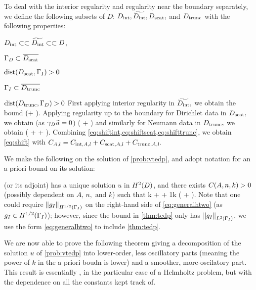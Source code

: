 To deal with the interior regularity and regularity near the boundary separately, we define the following subsets of $D$: $D_{\mathrm{int}},\widetilde{D_{\mathrm{int}}},D_{\mathrm{scat}},$ and $D_{\mathrm{trunc}}$ with the following properties:
\bit
\item $D_{\mathrm{int}} \subset\subset \widetilde{D_{\mathrm{int}}} \subset\subset D$,
\item $\Gamma_{D} \subset \overline{D_{\mathrm{scat}}}$
\item $\operatorname{dist}(D_{\mathrm{scat}},\Gamma_{I}) > 0 $
  \item $\Gamma_{I} \subset \overline{D_{\mathrm{trunc}}}$
\item $\operatorname{dist}(D_{\mathrm{trunc}},\Gamma_{D}) > 0 $
    \eit
    First applying interior regularity \cite[Theorem 4.16]{Mc:00} in $\widetilde{D_{\mathrm{int}}},$ we obtain the bound
    \beq\label{eq:shiftint}
\NHlptDint{\utilde} \leq \CintAl \mleft(\NHoDinttilde + \NHlDinttilde{\ftilde}\mright).
\eeq
Applying regularity up to the boundary for Dirichlet data \cite[Theorem 4.18 (i)]{Mc:00} in $D_{\mathrm{scat}},$ we obtain (as $\gamma_{D} \widetilde{u} = 0$)
\beq\label{eq:shiftscat}
\NHlptDscat{\utilde} \leq \CscatAl \mleft(\NHoD{\utilde} + \NHlD{\ftilde}\mright)
\eeq
and similarly for Neumann data \cite[Theorem 4.18 (ii)]{Mc:00} in $D_{\mathrm{trunc}},$ we obtain
\beq\label{eq:shifttrunc}
\NHlptDtrunc{\utilde} \leq \CtruncAl \mleft(\NHoD{\utilde} + \NHlphGI{\dn \utilde} + \NHlD{\ftilde}\mright).
\eeq
Combining \cref{eq:shiftint,eq:shiftscat,eq:shifttrunc}, we obtain \cref{eq:shift} with $C_{A,l} = C_{\mathrm{int},A,l} + C_{\mathrm{scat},A,l} + C_{\mathrm{trunc},A,l}.$
\epf

We make the following  on the solution of \cref{prob:vtedp}, and adopt notation for an a priori bound on its solution:

\bas\label{ass:htwo}
 (or its adjoint) has a unique solution $u$ in $\HtD$, and there exists $\CAnk>0$ (possibly dependent on $A$, $n,$ and $k$) such that
\beq\label{eq:generalhtwo}
k  +  + \frac1k  \leq \CAnk \mleft( + \NLtGI{\gI}\mright).
\eeq
\eas
Note that one could require $\NHhGI{\gI}$ on the right-hand side of \cref{eq:generalhtwo} (as $\gI \in \HhGI$); however, since the bound in \cref{thm:tedp} only has $\NLtGI{\gI}$, we use the form \cref{eq:generalhtwo} to include \cref{thm:tedp}.

We are now able to prove the following theorem giving a decomposition of the solution $u$ of \cref{prob:vtedp} into lower-order, less oscillatory parts (meaning the power of $k$ in the a priori boudn is lower) and a smoother, more-oscilatory part. This result is essentially \cite[Theorem 1]{ChNi:18a}, in the particular case of a Helmholtz problem, but with the dependence on all the constants kept track of.

